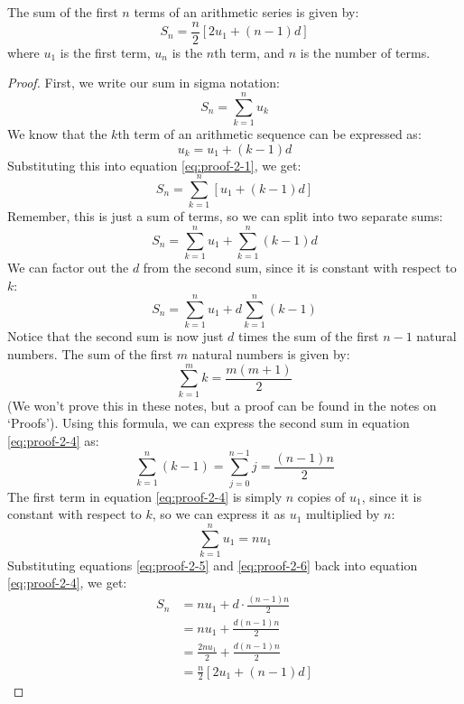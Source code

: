 \begin{proposition}\label{prop:arithmetic-series-sum}
	The sum of the first $n$ terms of an arithmetic series is given by:
	\begin{equation*}
		S_n = \frac{n}{2}\left[2u_1 + (n-1)d\right]
	\end{equation*}
	where $u_1$ is the first term, $u_n$ is the $n$th term, and $n$ is the number of terms.
\end{proposition}
\begin{proof}
	First, we write our sum in sigma notation:
	\begin{equation}\label{eq:proof-2-1}
		S_n = \sum_{k=1}^{n} u_k
	\end{equation}
	We know that the $k$th term of an arithmetic sequence can be expressed as:
	\begin{equation*}
		u_k = u_1 + (k-1)d
	\end{equation*}
	Substituting this into equation \eqref{eq:proof-2-1}, we get:
	\begin{equation}\label{eq:proof-2-2}
		S_n = \sum_{k=1}^{n} \left[u_1 + (k-1)d\right]
	\end{equation}
	Remember, this is just a sum of terms, so we can split into two separate sums:
	\begin{equation}\label{eq:proof-2-3}
		S_n = \sum_{k=1}^{n} u_1 + \sum_{k=1}^{n} (k-1)d
	\end{equation}
	We can factor out the $d$ from the second sum, since it is constant with respect to $k$:
	\begin{equation}\label{eq:proof-2-4}
		S_n = \sum_{k=1}^{n} u_1 + d\sum_{k=1}^{n} (k-1)
	\end{equation}
	Notice that the second sum is now just $d$ times the sum of the first $n-1$ natural numbers. The sum of the
	first $m$ natural numbers is given by:
	\begin{equation*}
		\sum_{k=1}^{m} k = \frac{m(m+1)}{2}
	\end{equation*}
	(We won't prove this in these notes, but a proof can be found in the notes on `Proofs'). Using this 
	formula, we can express the second sum in equation \eqref{eq:proof-2-4} as:
	\begin{equation}\label{eq:proof-2-5}
		\sum_{k=1}^{n} (k-1) = \sum_{j=0}^{n-1} j = \frac{(n-1)n}{2}
	\end{equation}
	The first term in equation \eqref{eq:proof-2-4} is simply $n$ copies of $u_1$, since it is constant with respect to $k$, so
	we can express it as $u_1$ multiplied by $n$:
	\begin{equation}\label{eq:proof-2-6}
		\sum_{k=1}^{n} u_1 = nu_1
	\end{equation}
	Substituting equations \eqref{eq:proof-2-5} and \eqref{eq:proof-2-6} back into equation \eqref{eq:proof-2-4}, we get:
	\begin{align*}
		S_n &= nu_1 + d \cdot \frac{(n-1)n}{2} \\
		&= nu_1 + \frac{d(n-1)n}{2} \\
		&= \frac{2nu_1}{2} + \frac{d(n-1)n}{2} \\
		&= \frac{n}{2}\left[2u_1 + (n-1)d\right]
	\end{align*}
\end{proof}

